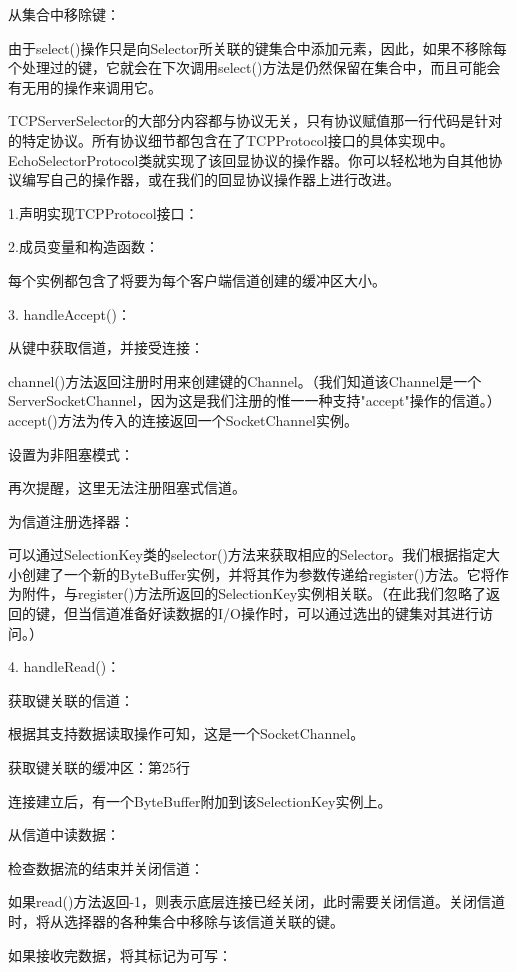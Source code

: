 	从集合中移除键：

	由于select()操作只是向Selector所关联的键集合中添加元素，因此，如果不移除每个处理过的键，它就会在下次调用select()方法是仍然保留在集合中，而且可能会有无用的操作来调用它。 

	TCPServerSelector的大部分内容都与协议无关，只有协议赋值那一行代码是针对的特定协议。所有协议细节都包含在了TCPProtocol接口的具体实现中。EchoSelectorProtocol类就实现了该回显协议的操作器。你可以轻松地为自其他协议编写自己的操作器，或在我们的回显协议操作器上进行改进。 

	

	1.声明实现TCPProtocol接口：

	2.成员变量和构造函数：

	每个实例都包含了将要为每个客户端信道创建的缓冲区大小。 

	3. handleAccept()： 

	从键中获取信道，并接受连接：

	channel()方法返回注册时用来创建键的Channel。（我们知道该Channel是一个ServerSocketChannel，因为这是我们注册的惟一一种支持"accept"操作的信道。）accept()方法为传入的连接返回一个SocketChannel实例。 

	设置为非阻塞模式：

	再次提醒，这里无法注册阻塞式信道。 

	为信道注册选择器：

	可以通过SelectionKey类的selector()方法来获取相应的Selector。我们根据指定大小创建了一个新的ByteBuffer实例，并将其作为参数传递给register()方法。它将作为附件，与register()方法所返回的SelectionKey实例相关联。（在此我们忽略了返回的键，但当信道准备好读数据的I/O操作时，可以通过选出的键集对其进行访问。） 

	4. handleRead()：

	获取键关联的信道：

	根据其支持数据读取操作可知，这是一个SocketChannel。 

	获取键关联的缓冲区：第25行 

	连接建立后，有一个ByteBuffer附加到该SelectionKey实例上。 

	从信道中读数据： 

	检查数据流的结束并关闭信道：

	如果read()方法返回-1，则表示底层连接已经关闭，此时需要关闭信道。关闭信道时，将从选择器的各种集合中移除与该信道关联的键。 

	如果接收完数据，将其标记为可写：

